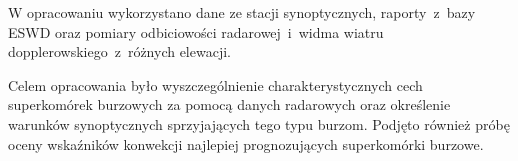 \documentclass[\main/boa.tex]{subfiles}
\begin{document}
W opracowaniu wykorzystano dane ze stacji synoptycznych, raporty~z~bazy ESWD oraz pomiary odbiciowości radarowej~i~widma wiatru dopplerowskiego~z~różnych elewacji.

Celem opracowania było wyszczególnienie charakterystycznych cech superkomórek burzowych za pomocą danych radarowych oraz określenie warunków synoptycznych sprzyjających tego typu burzom. Podjęto również próbę oceny wskaźników konwekcji najlepiej prognozujących superkomórki burzowe.
\end{document}
